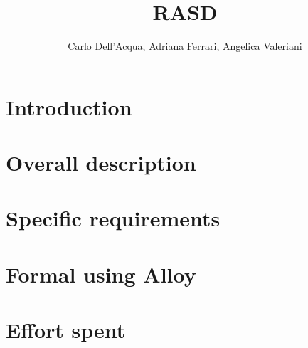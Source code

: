 \documentclass{report}
\begin{document}
  \title{RASD}
  \author{Carlo Dell'Acqua, Adriana Ferrari, Angelica Valeriani}
  \maketitle

  \tableofcontents

  \chapter{Introduction}
  

  \chapter{Overall description}
  

  \chapter{Specific requirements}
  
  
  \chapter{Formal using Alloy}
  

  \chapter{Effort spent}
  

  \begin{thebibliography}{0}
  \end{thebibliography}
\end{document}

